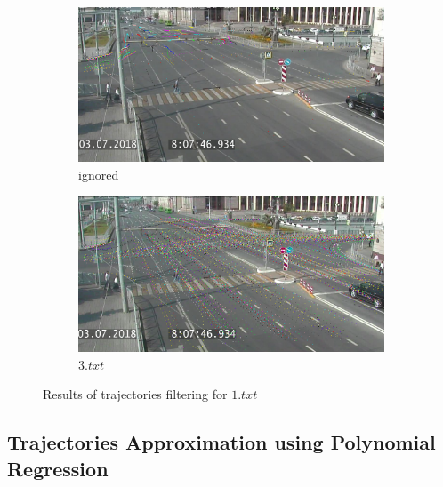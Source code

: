 \begin{figure}[!htb]
	\centering
	\begin{subfigure}[!htb]{0.48\textwidth}
		\centering{}
		\includegraphics[width=\textwidth]{images/traj-filter-out.png}
		\caption{ignored}
		\label{fig:traj_filter_out}
	\end{subfigure}
	\hfill
	\begin{subfigure}[!htb]{0.48\textwidth}
		\centering{}
		\includegraphics[width=\textwidth]{images/traj-filter-keep.png}
		\caption{$3.txt$}
		\label{fig:traj_filter_keep}
	\end{subfigure}
	\caption{Results of trajectories filtering for $1.txt$}
	\label{fig:traj_filter}
\end{figure}

\subsection{Trajectories Approximation using Polynomial Regression}

